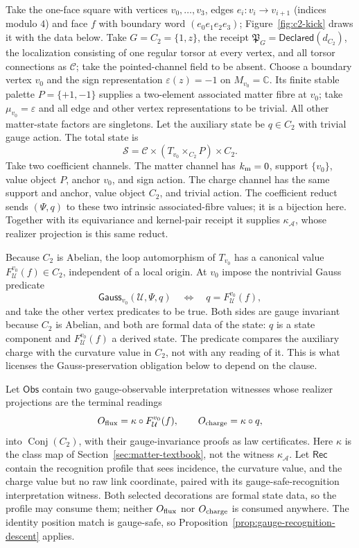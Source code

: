 \begin{example}
\label{ex:complete-c2-profile}
Take the one-face square with vertices $v_0,\ldots,v_3$, edges
$e_i:v_i\to v_{i+1}$ (indices modulo $4$) and face $f$ with boundary word
$(e_0e_1e_2e_3)$; Figure~\ref{fig:c2-kick} draws it with the data below.
Take $G=C_2=\{1,z\}$, the receipt $\mathfrak P_G=\mathsf{Declared}(d_{C_2})$,
the localization consisting of one regular torsor at every vertex, and all
torsor connections as $\mathcal C$; take the pointed-channel field to be
absent.  Choose a boundary vertex $v_0$ and the sign
representation $\varepsilon(z)=-1$ on $M_{v_0}=\mathbb C$.  Its finite stable
palette $P=\{+1,-1\}$ supplies a two-element associated matter fibre at
$v_0$; take $\mu_{v_0}=\varepsilon$ and all edge and other vertex
representations to be trivial.  All other matter-state factors are
singletons.  Let the auxiliary state be $q\in C_2$ with trivial gauge action.
The total state is
\[
 \mathcal S=\mathcal C\times
 (T_{v_0}\times_{C_2}P)\times C_2.
\]
Take two coefficient channels.  The matter channel has
$k_{\rm m}=0$, support $\{v_0\}$, value object $P$, anchor $v_0$, and sign
action.  The charge channel has the same support and anchor, value object
$C_2$, and trivial action.  The coefficient reduct sends $(\Psi,q)$ to these
two intrinsic associated-fibre values; it is a bijection here.  Together with
its equivariance and kernel-pair receipt it supplies
$\kappa_{\mathcal A}$, whose realizer projection is this same reduct.

Because $C_2$ is Abelian, the loop automorphism of $T_{v_0}$ has a canonical
value $F_{\mathcal U}^{v_0}(f)\in C_2$, independent of a local origin.  At
$v_0$ impose the nontrivial Gauss predicate
\[
 \mathsf{Gauss}_{v_0}(\mathcal U,\Psi,q)
 \quad\Longleftrightarrow\quad
 q=F_{\mathcal U}^{v_0}(f),
\]
and take the other vertex predicates to be true.  Both sides are gauge
invariant because $C_2$ is Abelian, and both are formal data of the state:
$q$ is a state component and $F_{\mathcal U}^{v_0}(f)$ a derived state.  The
predicate compares the auxiliary charge with the curvature value in $C_2$, not
with any reading of it.  This is what licenses the Gauss-preservation
obligation below to depend on the clause.

Let $\mathsf{Obs}$ contain two gauge-observable interpretation witnesses
whose realizer projections are the terminal readings
\[
 O_{\rm flux}=\kappa\circ F_{\mathcal U}^{v_0}(f),
 \qquad
 O_{\rm charge}=\kappa\circ q,
\]
into $\operatorname{Conj}(C_2)$, with their gauge-invariance proofs as law
certificates.  Here $\kappa$ is the class map of
Section~\ref{sec:matter-textbook}, not the witness $\kappa_{\mathcal A}$.  Let
$\mathsf{Rec}$ contain the recognition profile that sees
incidence, the curvature value, and the charge value but no raw link
coordinate, paired with its gauge-safe-recognition interpretation witness.
Both selected decorations are formal state data, so the profile may consume
them; neither $O_{\rm flux}$ nor $O_{\rm charge}$ is consumed anywhere.  The
identity position match is gauge-safe, so
Proposition~\ref{prop:gauge-recognition-descent} applies.


\end{example}

